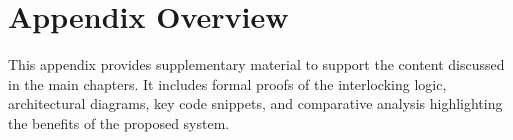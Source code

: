 \section*{Appendix Overview}
This appendix provides supplementary material to support the content discussed in the main chapters. It includes formal proofs of the interlocking logic, architectural diagrams, key code snippets, and comparative analysis highlighting the benefits of the proposed system.
